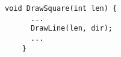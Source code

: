 \begin{frame}[fragile]{}

  \vspace{-0.30cm}
  \begin{lstlisting}[style = Cstyle]
    void DrawSquare(int len) {
      ...
      DrawLine(len, dir);
      ...
    }
  \end{lstlisting}
\end{frame}

